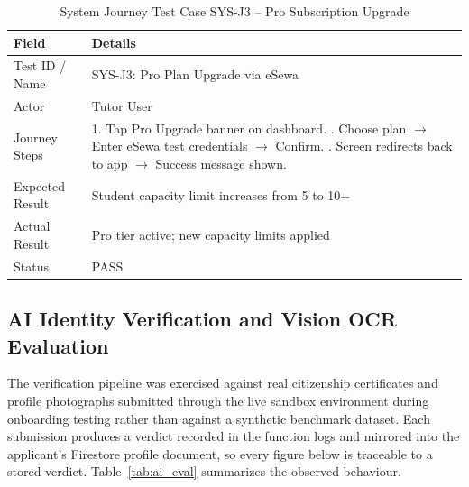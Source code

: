 \documentclass[12pt]{report}
\begin{document}
\begin{table}[H]
\centering
\caption{System Journey Test Case SYS-J3 -- Pro Subscription Upgrade}
\label{tab:sysj3}
\small
\begin{tabular}{|p{3.2cm}|p{11.5cm}|}
\hline
\textbf{Field} & \textbf{Details} \\
\hline
Test ID / Name & SYS-J3: Pro Plan Upgrade via eSewa \\
\hline
Actor & Tutor User \\
\hline
Journey Steps & 1. Tap Pro Upgrade banner on dashboard. \newline
2. Choose plan $\to$ Enter eSewa test credentials $\to$ Confirm. \newline
3. Screen redirects back to app $\to$ Success message shown. \\
\hline
Expected Result & Student capacity limit increases from 5 to 10+ \\
\hline
Actual Result & Pro tier active; new capacity limits applied \\
\hline
Status & PASS \\
\hline
\end{tabular}
\end{table}

\subsection{AI Identity Verification and Vision OCR Evaluation}
The verification pipeline was exercised against real citizenship certificates and profile photographs submitted through the live sandbox environment during onboarding testing rather than against a synthetic benchmark dataset. Each submission produces a verdict recorded in the function logs and mirrored into the applicant's Firestore profile document, so every figure below is traceable to a stored verdict. Table~\ref{tab:ai_eval} summarizes the observed behaviour.
\end{document}
